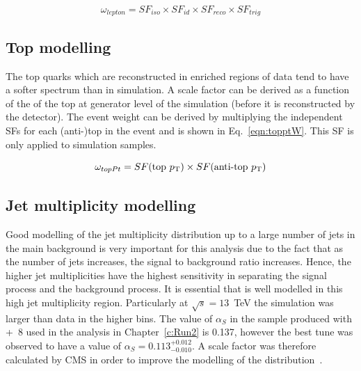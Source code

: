 \begin{equation}
\omega_{lepton} = SF_{iso}\times SF_{id}\times SF_{reco}\times SF_{trig}
\label{eqn:leptonW}
\end{equation}

\subsection{Top \pt modelling}

The top quarks which are reconstructed in \ttbar enriched regions of data tend to have a softer \pt spectrum than in \ttbar simulation. A scale factor can be derived as a function of the \pt of the top at generator level of the simulation (before it is reconstructed by the detector). The event weight can be derived by multiplying the independent SFs for each (anti-)top in the event and is shown in Eq.~\ref{eqn:topptW}. This SF is only applied to \ttbar simulation samples.

\begin{equation}
\omega_{topPt} = SF(\textrm{top}~p_{\mathrm{T}})\times SF(\textrm{anti-top}~p_{\mathrm{T}})
\label{eqn:topptW}
\end{equation}

\subsection{Jet multiplicity modelling \label{subsec:alphaS}}
Good modelling of the jet multiplicity distribution up to a large number of jets in the main \ttbar background is very important for this analysis due to the fact that as the number of jets increases, the signal to background ratio increases. Hence, the higher jet multiplicities have the highest sensitivity in separating the signal \tttt process and the background \ttbar process. It is essential that \ttbar is well modelled in this high jet multiplicity region. 
Particularly at $\sqrt{s}=13$~TeV the simulation was larger than data in the higher \njets bins. The value of $\alpha_S$ in the \ttbar sample produced with \POWHEG+\PYTHIA~8 used in the analysis in Chapter~\ref{c:Run2} is 0.137, however the best tune was observed to have a value of $\alpha_S=0.113^{+0.012}_{-0.010}$. A scale factor was therefore calculated by CMS in order to improve the modelling of the \njets distribution~\cite{Khachatryan:2015mva}. 

